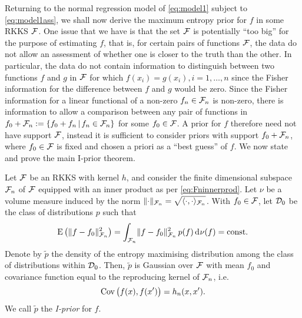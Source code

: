 Returning to the normal regression model of \cref{eq:model1} subject to \cref{eq:model1ass}, we shall now derive the maximum entropy prior for $f$ in some RKKS ${\mathcal F}$.
One issue that we have is that the set ${\mathcal F}$ is potentially ``too big'' for the purpose of estimating $f$, that is, for certain pairs of functions ${\mathcal F}$, the data do not allow an assessment of whether one is closer to the truth than the other.
In particular, the data do not contain information to distinguish between two functions $f$ and $g$ in ${\mathcal F}$ for which $f(x_i) = g(x_i), i=1,\dots,n$ since the Fisher information for the difference between $f$ and $g$ would be zero.
Since the Fisher information for a linear functional of a non-zero $f_n \in {\mathcal F}_n$ is non-zero, there is information to allow a comparison between any pair of functions in $f_0 + {\mathcal F}_n := \{f_0 + f_n \,|\,  f_n \in {\mathcal F}_n \}$ for some $f_0 \in {\mathcal F}$.
A prior for $f$ therefore need not have support ${\mathcal F}$, instead it is sufficient to consider priors with support $f_0 + {\mathcal F}_n$, where $f_0 \in {\mathcal F}$ is fixed and chosen a priori as a ``best guess'' of $f$.
We now state and prove the main I-prior theorem.

\pagebreak
\begin{theorem}[I-prior]
  Let ${\mathcal F}$ be an RKKS with kernel $h$, and consider the finite dimensional subspace ${\mathcal F}_n$ of ${\mathcal F}$ equipped with an inner product as per \cref{eq:Fninnerprod}.
  Let $\nu$ be a volume measure induced by the norm $\lVert\cdot\rVert_{{\mathcal F}_n} = \sqrt{\langle\cdot,\cdot\rangle_{{\mathcal F}_n}}$.
  With $f_0 \in {\mathcal F}$, let ${\mathcal D}_0$ be the class of distributions $p$ such that 
  \[
    \operatorname{E}\big(\lVert f-f_0\rVert^2_{{\mathcal F}_n}\big) = \int_{{\mathcal F}_n} \lVert f-f_0\rVert^2_{{\mathcal F}_n} \, p(f) \operatorname{d}\hspace{0.5pt}\! \nu(f) = \text{const.}\hspace{0.01em}
  \]
  Denote by $\tilde p$ the density of the entropy maximising distribution among the class of distributions within ${\mathcal D}_0$.
  Then, $\tilde p$ is Gaussian over ${\mathcal F}$ with mean $f_0$ and covariance function equal to the reproducing kernel of ${\mathcal F}_n$, i.e.
  \[
    \operatorname{Cov}\big(f(x),f(x')\big) = h_n(x,x').
  \]
  We call $\tilde p$ the \emph{I-prior} for $f$.
\end{theorem}

